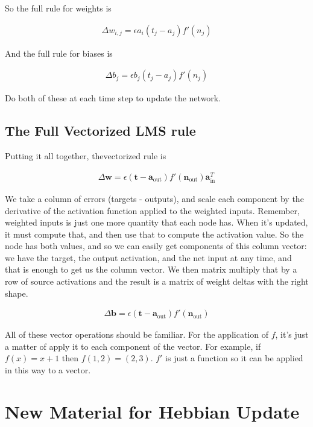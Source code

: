 So  the full rule for weights is

\begin{eqnarray*}
\Delta w_{i,j}  =  \epsilon a_i (t_j - a_j) f' (n_j)
\end{eqnarray*}

And the full rule for biases is 

\begin{eqnarray*}
\Delta b_{j}  =  \epsilon b_j (t_j - a_j) f' (n_j)
\end{eqnarray*}

Do both of these at each time step to update the network.


\subsection{The Full Vectorized LMS rule}

Putting it all together, thevectorized rule is

\begin{eqnarray*}
\Delta \mathbf{w}  =  \epsilon (\mathbf{t} - \mathbf{a}_{\text{out}}) f'( \mathbf{n}_{\text{out}}) \mathbf{a}_{\text{in}}^T
\end{eqnarray*}

We take a column of errors (targets - outputs), and scale each component by the derivative of the activation function applied to the weighted inputs. Remember, weighted inputs is just one more quantity that each node has. When it's updated, it must compute that, and then use that to compute the activation value. So the node has both values, and so we can easily get components of this column vector: we have the target, the output activation, and the net input at any time, and that is enough to get us the column vector. We then matrix multiply that by a row of source activations and the result is a matrix of weight deltas with the right shape.

\begin{eqnarray*}
\Delta \mathbf{b}  =  \epsilon (\mathbf{t} - \mathbf{a}_{\text{out}}) f'( \mathbf{n}_{\text{out}})
\end{eqnarray*}

All of these vector operations should be familiar. For the application of $f$, it's just a matter of apply it to each component of the vector.  For example, if $f(x) = x+1$ then $f(1,2) = (2,3)$. $f'$ is just a function so it can be applied in this way to a vector.

\section{New Material for Hebbian Update}

